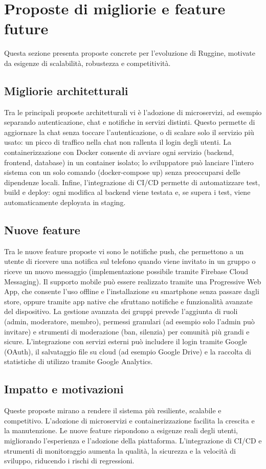 \chapter{Proposte di migliorie e feature future}

Questa sezione presenta proposte concrete per l'evoluzione di Ruggine, motivate da esigenze di scalabilità, robustezza e competitività.


\section{Migliorie architetturali}
Tra le principali proposte architetturali vi è l'adozione di microservizi, ad esempio separando autenticazione, chat e notifiche in servizi distinti. Questo permette di aggiornare la chat senza toccare l'autenticazione, o di scalare solo il servizio più usato: un picco di traffico nella chat non rallenta il login degli utenti. La containerizzazione con Docker consente di avviare ogni servizio (backend, frontend, database) in un container isolato; lo sviluppatore può lanciare l'intero sistema con un solo comando (docker-compose up) senza preoccuparsi delle dipendenze locali. Infine, l'integrazione di CI/CD permette di automatizzare test, build e deploy: ogni modifica al backend viene testata e, se supera i test, viene automaticamente deployata in staging.


\section{Nuove feature}
Tra le nuove feature proposte vi sono le notifiche push, che permettono a un utente di ricevere una notifica sul telefono quando viene invitato in un gruppo o riceve un nuovo messaggio (implementazione possibile tramite Firebase Cloud Messaging). Il supporto mobile può essere realizzato tramite una Progressive Web App, che consente l'uso offline e l'installazione su smartphone senza passare dagli store, oppure tramite app native che sfruttano notifiche e funzionalità avanzate del dispositivo. La gestione avanzata dei gruppi prevede l'aggiunta di ruoli (admin, moderatore, membro), permessi granulari (ad esempio solo l'admin può invitare) e strumenti di moderazione (ban, silenzia) per comunità più grandi e sicure. L'integrazione con servizi esterni può includere il login tramite Google (OAuth), il salvataggio file su cloud (ad esempio Google Drive) e la raccolta di statistiche di utilizzo tramite Google Analytics.

\section{Impatto e motivazioni}
Queste proposte mirano a rendere il sistema più resiliente, scalabile e competitivo. L'adozione di microservizi e containerizzazione facilita la crescita e la manutenzione. Le nuove feature rispondono a esigenze reali degli utenti, migliorando l'esperienza e l'adozione della piattaforma. L'integrazione di CI/CD e strumenti di monitoraggio aumenta la qualità, la sicurezza e la velocità di sviluppo, riducendo i rischi di regressioni.
